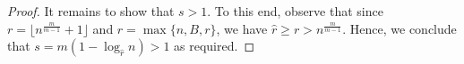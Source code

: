 \documentclass[10pt,a4paper]{article}
\begin{document}
\begin{proof}
			\vspace{.1 in}
			
			It remains to show that $s > 1$. To this end, observe that since $r=\lfloor n^{\frac{m}{m-1}}+1\rfloor$ and $\hat{r} = \max\{n, B, r\}$, we have $\hat{r} \geq r > n^{\frac{m}{m-1}}$. Hence, we conclude that $s = m(1 - \log_{\hat{r}}{n}) > 1$ as required.
		\end{proof}
			
\end{document}

